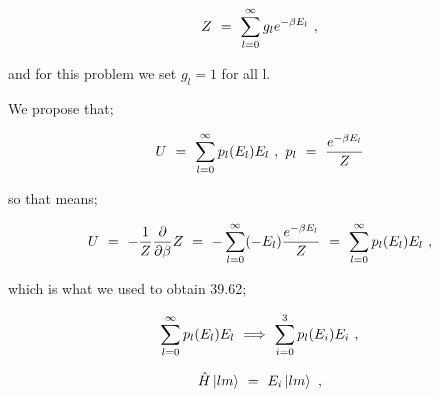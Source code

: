 \documentclass{article}
\begin{document}
\begin{equation} \label{eq:276}
Z \hspace{0.125cm} = \hspace{0.125cm} \sum_{l=0}^{\infty} g_{l} e^{-\beta E_{l}} \hspace{0.125cm} , 
\end{equation} 

and for this problem we set \begin{math} g_{l} = 1 \end{math} for all l.

We propose that;

\begin{equation} \label{eq:277}
U \hspace{0.125cm} = \hspace{0.125cm} \sum_{l=0}^{\infty} p_{l}(E_{l}) E_{l} \hspace{0.125cm} , \hspace{0.125cm} p_{l} \hspace{0.125cm} = \hspace{0.125cm} \frac{e^{-\beta E_{l}}}{Z}
\end{equation} 

so that means;

\begin{equation} \label{eq:278}
U \hspace{0.125cm} = \hspace{0.125cm} -\frac{1}{Z}\frac{\partial}{\partial{\beta}} Z \hspace{0.125cm} = \hspace{0.125cm} - \sum_{l=0}^{\infty} (-E_{l}) \frac{e^{-\beta E_{l}}}{Z}  \hspace{0.125cm} = \hspace{0.125cm} \sum_{l=0}^{\infty} p_{l}(E_{l}) E_{l} \hspace{0.125cm}, 
\end{equation}

which is what we used to obtain 39.62;
 
\begin{equation} \label{eq:279}
\sum_{l=0}^{\infty} p_{l}(E_{l}) E_{l} \hspace{0.125cm} \Longrightarrow \hspace{0.125cm} \sum_{i=0}^{3} p_{l}(E_{i}) E_{i} \hspace{0.125cm} ,
\end{equation}

\begin{equation} \label{eq:280}
\hat{H} \ket{l m} \hspace{0.125cm} = \hspace{0.125cm} E_{i} \ket{l m} \hspace{0.125cm} ,
\end{equation}
\end{document}

